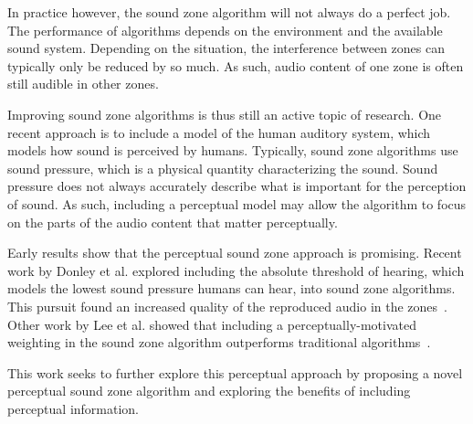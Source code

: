 In practice however, the sound zone algorithm will not always do a perfect job.
The performance of algorithms depends on the environment and the available sound system.
Depending on the situation, the interference between zones can typically only be reduced by so much.
As such, audio content of one zone is often still audible in other zones.

Improving sound zone algorithms is thus still an active topic of research.
One recent approach is to include a model of the human auditory system, which models how sound is perceived by humans.
Typically, sound zone algorithms use sound pressure, which is a physical quantity characterizing the sound.
Sound pressure does not always accurately describe what is important for the perception of sound.
As such, including a perceptual model may allow the algorithm to focus on the parts of the audio content
that matter perceptually.

Early results show that the perceptual sound zone approach is promising.
Recent work by Donley et al. explored including the absolute threshold of hearing, which models the lowest sound pressure
humans can hear, into sound zone algorithms.
This pursuit found an increased quality of the reproduced audio in the zones~\cite{donley2015multizone}.
Other work by Lee et al. showed that including a perceptually-motivated weighting in the sound zone algorithm outperforms 
traditional algorithms~\cite{lee2019towards,lee2020signal}.

This work seeks to further explore this perceptual approach by proposing a novel perceptual sound zone algorithm and exploring
the benefits of including perceptual information.
